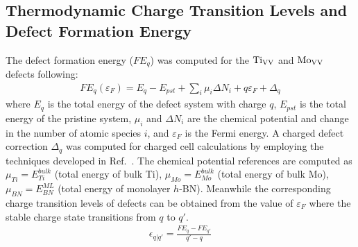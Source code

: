 \subsection{Thermodynamic Charge Transition Levels and Defect Formation Energy}
The defect formation energy ($FE_q$) was computed for the $\text{Ti}_{\text{V}\text{V}}$ and $\text{Mo}_{\text{V}\text{V}}$ defects following:
\begin{align}
    FE_q(\varepsilon_F) = E_q - E_{pst} + \sum_i \mu_i \Delta N_i + q \varepsilon_F + \Delta_q
    \label{eq:cfe}
\end{align}
where $E_q$ is the total energy of the defect system with charge $q$, $E_{pst}$ is the total energy of the pristine system, $\mu_i$ and $\Delta N_i$ are the chemical potential and change in the number of atomic species $i$, and $\varepsilon_F$ is the Fermi energy. A charged defect correction $\Delta_q$ was computed for charged cell calculations by employing the techniques developed in Ref.~\cite{wu2017first,PING2017JCP}. The chemical potential references are computed as $\mu_{Ti} = E_{Ti}^{bulk}$ (total energy of bulk Ti), $\mu_{Mo} = E_{Mo}^{bulk}$ (total energy of bulk Mo),  $\mu_{BN} = E_{BN}^{ML}$ (total energy of monolayer $h$-BN). Meanwhile the corresponding charge transition levels of defects can be obtained from the value of $\varepsilon_F$ where the stable charge state transitions from $q$ to $q'$.
\begin{align}
    \epsilon_{q|q'} = \frac{FE_q - FE_{q'}}{q' - q}
    \label{eq:ctl}
\end{align}

